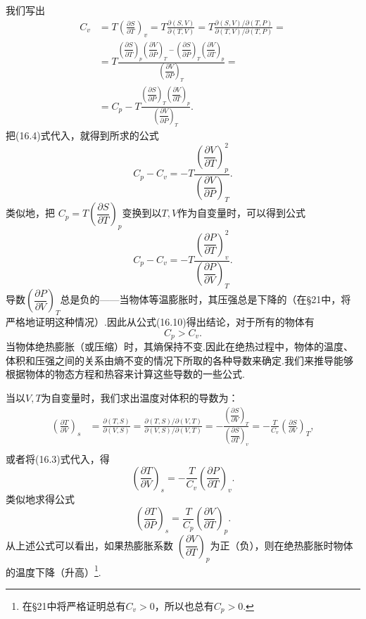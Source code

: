 我们写出
\begin{equation*}
\begin{aligned}
  C_v&=T\left(\frac{\partial S}{\partial T}\right)_v
  =T\frac{\partial(S,V)}{\partial(T,V)}
  =T\frac{\partial(S,V)/\partial(T,P)}
  {\partial(T,V)/\partial(T,P)}=\\
  &=T\frac{\left(\dfrac{\partial S}{\partial T}\right)_p
  \left(\dfrac{\partial V}{\partial P}\right)_T
  -\left(\dfrac{\partial S}{\partial P}\right)_T
  \left(\dfrac{\partial V}{\partial T}\right)_p}
  {\left(\dfrac{\partial V}{\partial P}\right)_T}=\\
  &=C_p-T\frac{\left(\dfrac{\partial S}{\partial P}\right)_T
  \left(\dfrac{\partial V}{\partial T}\right)_p}
  {\left(\dfrac{\partial V}{\partial P}\right)_T}.
\end{aligned}
\end{equation*}
把(16.4)式代入，就得到所求的公式
\begin{equation}
  C_p-C_v
  =-T\frac{\left(\dfrac{\partial V}{\partial T}\right)_p^2}
  {\left(\dfrac{\partial V}{\partial P}\right)_T}.
\end{equation}
类似地，把
$C_p=T\left(\dfrac{\partial S}{\partial T}\right)_p$变换到以$T,V$作为自变量时，可以得到公式
\begin{equation}
  C_p-C_v
  =-T\frac{\left(\dfrac{\partial P}{\partial T}\right)_v^2}
  {\left(\dfrac{\partial P}{\partial V}\right)_T}.
\end{equation}
导数$\left(\dfrac{\partial P}{\partial V}\right)_T$总是负的——当物体等温膨胀时，其压强总是下降的（在§21中，将严格地证明这种情况）.因此从公式(16.10)得出结论，对于所有的物体有
\begin{equation}
  C_p>C_v.
\end{equation}
当物体绝热膨胀（或压缩）时，其熵保持不变.因此在绝热过程中，物体的温度、体积和压强之间的关系由熵不变的情况下所取的各种导数来确定.我们来推导能够根据物体的物态方程和热容来计算这些导数的一些公式.

当以$V,T$为自变量时，我们求出温度对体积的导数为：
\begin{equation*}
\begin{aligned}
  \left(\frac{\partial T}{\partial V}\right)_s
  &=\frac{\partial(T,S)}{\partial(V,S)}
  =\frac{\partial(T,S)/\partial(V,T)}
  {\partial(V,S)/\partial(V,T)}
  =-\frac{\left(\dfrac{\partial S}{\partial V}\right)_T}
  {\left(\dfrac{\partial S}{\partial T}\right)_v}
  =-\frac{T}{C_v}\left(\frac{\partial S}{\partial V}\right)_T,\\
\end{aligned}
\end{equation*}
或者将(16.3)式代入，得
\begin{equation}
  \left(\frac{\partial T}{\partial V}\right)_s
  =-\frac{T}{C_v}\left(\frac{\partial P}{\partial T}\right)_v.
\end{equation}
类似地求得公式
\begin{equation}
  \left(\frac{\partial T}{\partial P}\right)_s
  =\frac{T}{C_p}\left(\frac{\partial V}{\partial T}\right)_p.
\end{equation}
从上述公式可以看出，如果热膨胀系数
$\left(\dfrac{\partial V}{\partial T}\right)_p$为正（负），则在绝热膨胀时物体的温度下降（升高）\footnote{在§21中将严格证明总有$C_v>0$，所以也总有$C_p>0$.}.

